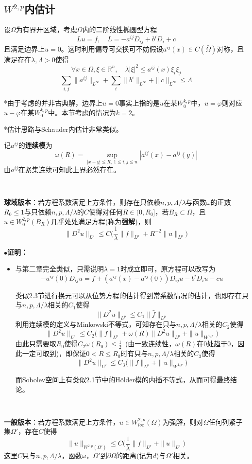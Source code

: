 \documentclass[a4paper,UTF8,fontset=windows,AutoFakeBold]{ctexart}
\newcommand{\proo}[1]{{\kaishu $\bullet$\textbf{证明：}
\begin{itemize}
    \item[] #1
\end{itemize}
}}
\begin{document}
\subsection{$W^{2,p}$内估计}
设$\Omega$为有界开区域，考虑$\Omega$内的二阶线性椭圆型方程
$$Lu=f,\quad L=-a^{ij}D_{ij}+b^iD_i+c$$
且满足边界上$u=0$。这时利用偏导可交换可不妨假设$a^{ij}(x)\in C(\bar\Omega)$对称，且满足存在$\lambda,\Lambda>0$使得
$$\forall x\in\Omega,\xi\in\mathbb{R}^n,\quad\lambda|\xi|^2\le a^{ij}(x)\xi_i\xi_j$$
$$\sum_{i,j}\|a^{ij}\|_{L^\infty}+\sum_i\|b^i\|_{L^\infty}+\|c\|_{L^\infty}\le\Lambda$$

*由于考虑的并非古典解，边界上$u=0$事实上指的是$u$在某$W_0^{k,p}$中，$u=\varphi$则对应$u-\varphi$在某$W_0^{k,p}$中。本节考虑的情况为$k=2$。

*估计思路与Schauder内估计非常类似。

记$a^{ij}$的\textbf{连续模}为
$$\omega(R)=\sup_{|x-y|\le R,\ 1\le i,j\le n}|a^{ij}(x)-a^{ij}(y)|$$
由$a^{ij}$在紧集连续可知此上界必然存在。

\

\textbf{球域版本}：若方程系数满足上方条件，则存在只依赖$n,p,\Lambda/\lambda$与函数$\omega$的正数$R_0\le1$与只依赖$n,p,\Lambda/\lambda$的$C$使得对任何$R\in(0,R_0]$，若$B_R\subset\Omega$，且$u\in W_0^{2,p}(B_R)$几乎处处满足方程(称为\textbf{强解})，则
$$\|D^2u\|_{L^p}\le C\bigg(\frac{1}{\lambda}\|f\|_{L^p}+R^{-2}\|u\|_{L^p}\bigg)$$

\proo{
    与第二章完全类似，只需说明$\lambda=1$时成立即可，原方程可以改写为
    $$-a^{ij}(0)D_{ij}u=f+(a^{ij}(x)-a^{ij}(0))D_{ij}u-b^iD_iu-cu$$

    类似2.3节进行换元可以从位势方程的估计得到常系数情况的估计，也即存在只与$n,p,\Lambda/\lambda$相关的$C_1$使得
    $$\|D^2u\|_{L^p}\le C_1\|\bar{f}\|_{L^p}$$
    利用连续模的定义与Minkowski不等式，可知存在只与$n,p,\Lambda/\lambda$相关的$C_2$使得
    $$\|D^2u\|_{L^p}\le C_2\big(\|f\|_{L^p}+\omega(R)\|D^2u\|_{L^p}+\|u\|_{W^{1,p}}\big)$$
    由此只需要取$R_0$使得$C_2\omega(R_0)\le\frac{1}{2}$\ (由一致连续性，$\omega(R)$在0处趋于0，因此一定可取到)，即保证$0<R\le R_0$时有只与$n,p,\Lambda/\lambda$相关的$C_3$使得
    $$\|D^2u\|_{L^p}\le C_3\big(\|f\|_{L^p}+\|u\|_{W^{1,p}}\big)$$
    
    而Sobolev空间上有类似2.1节中的H\"older模的内插不等式，从而可得最终结论。
}

\

\textbf{一般版本}：若方程系数满足上方条件，$u\in W^{2,p}_{loc}(\Omega)$为强解，则对$\Omega$任何列紧子集$\Omega'$，存在$C$使得
$$\|u\|_{W^{2,p}(\Omega')}\le C\bigg(\frac{1}{\lambda}\|f\|_{L^p}+\|u\|_{L^p}\bigg)$$
这里$C$只与$n,p,\Lambda/\lambda$，函数$\omega$，$\Omega'$到$\partial\Omega$的距离(记为$d$)与$\Omega'$相关。
\end{document}
